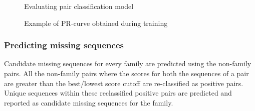 \documentclass{article}
\begin{document}
			\begin{figure}
				\caption{Evaluating pair classification model}
				\label{fig:train_classify2}
			\end{figure}
			
			\begin{figure}[h!]
				\caption{Example of PR-curve obtained during training}
				\label{fig:test_PR-curve}
			\end{figure}
		
			\subsubsection{Predicting missing sequences}
			Candidate missing sequences for every family are predicted using the non-family pairs. All the non-family pairs where the scores for both the sequences of a pair are greater than the best/lowest score cutoff are re-classified as positive pairs. Unique sequences within these reclassified positive pairs are predicted and reported as candidate missing sequences for the family.
			
\end{document}
